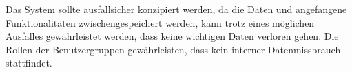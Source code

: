 \documentclass[../../Pflichtenheft.tex]{subfiles}
\begin{document}
    Das System sollte ausfallsicher konzipiert werden, da die Daten und angefangene Funktionalitäten zwischengespeichert werden,
    kann trotz eines möglichen Ausfalles gewährleistet werden, dass keine wichtigen Daten verloren gehen.
    Die Rollen der Benutzergruppen gewährleisten, dass kein interner Datenmissbrauch stattfindet.
\end{document}
